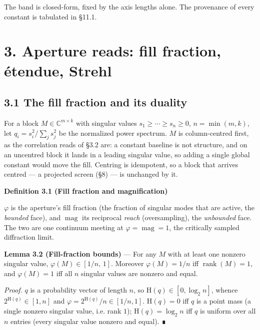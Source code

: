 \documentclass[10pt,letterpaper,twocolumn]{article}
\begin{document}
The band is closed-form, fixed by the axis lengths alone. The provenance of every constant is tabulated in §11.1.

\section{3. Aperture reads: fill fraction, étendue, Strehl}\label{3-aperture-reads-fill-fraction-etendue-strehl}

\subsection{3.1 The fill fraction and its duality}\label{31-the-fill-fraction-and-its-duality}

For a block \(M\in\mathbb{C}^{m\times k}\) with singular values \(s_1\ge\cdots\ge s_n\ge 0\), \(n=\min(m,k)\), let \(q_i=s_i^2/\sum_j s_j^2\) be the normalized power spectrum. \(M\) is column-centred first, as the correlation reads of §3.2 are: a constant baseline is not structure, and on an uncentred block it lands in a leading singular value, so adding a single global constant would move the fill. Centring is idempotent, so a block that arrives centred --- a projected screen (§8) --- is unchanged by it.

\textbf{Definition 3.1 (Fill fraction and magnification)}


\(\varphi\) is the aperture's fill fraction (the fraction of singular modes that are active, the \emph{bounded} face), and \(\operatorname{mag}\) its reciprocal \emph{reach} (oversampling), the \emph{unbounded} face. The two are one continuum meeting at \(\varphi=\operatorname{mag}=1\), the critically sampled diffraction limit.

\textbf{Lemma 3.2 (Fill-fraction bounds)} --- For any \(M\) with at least one nonzero singular value, \(\varphi(M)\in[1/n,\,1]\). Moreover \(\varphi(M)=1/n\) iff \(\operatorname{rank}(M)=1\), and \(\varphi(M)=1\) iff all \(n\) singular values are nonzero and equal.

\emph{Proof.} \(q\) is a probability vector of length \(n\), so \(\mathrm{H}(q)\in[0,\log_2 n]\), whence \(2^{\mathrm{H}(q)}\in[1,n]\) and \(\varphi=2^{\mathrm{H}(q)}/n\in[1/n,1]\). \(\mathrm{H}(q)=0\) iff \(q\) is a point mass (a single nonzero singular value, i.e. rank \(1\)); \(\mathrm{H}(q)=\log_2 n\) iff \(q\) is uniform over all \(n\) entries (every singular value nonzero and equal). ∎
\end{document}

